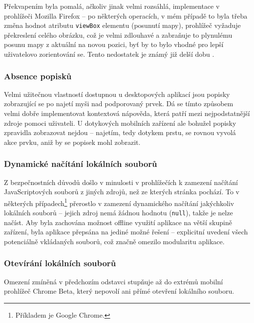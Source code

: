 Překvapením byla pomalá, ačkoliv jinak velmi rozsáhlá, implementace  v prohlížeči Mozilla Firefox -- po některých operacích, v mém případě to byla třeba změna hodnot atributu \texttt{viewBox}  elementu (posunutí mapy), prohlížeč vyžaduje překreslení celého obrázku, což je velmi zdlouhavé a zabraňuje to plynulému posunu mapy z aktuální na novou pozici, byť by to bylo vhodné pro lepší uživatelovo zorientování se. Tento nedostatek je známý již delší dobu \cite{Bugzilla}.

\subsubsection{Absence popisků}
Velmi užitečnou vlastností dostupnou u desktopových aplikací jsou popisky zobrazující se po najetí myši nad podporovaný prvek. Dá se tímto způsobem velmi dobře implementovat kontextová nápověda, která patří mezi nejpodstatnější zdroje pomoci uživateli. U dotykových mobilních zařízení ale bohužel popisky zpravidla zobrazovat nejdou -- najetím, tedy dotykem prstu, se rovnou vyvolá akce prvku, aniž by se popisek mohl zobrazit.

\subsubsection{Dynamické načítání lokálních souborů}
Z bezpečnostních důvodů došlo v minulosti v prohlížečích k zamezení načítání JavaScriptových souborů z jiných zdrojů, než ze kterých stránka pochází. To v některých případech\footnote{Příkladem je Google Chrome.} přerostlo v zamezení dynamického načítání jakýchkoliv lokálních souborů -- jejich zdroj nemá žádnou hodnotu (\texttt{null}), takže je nelze načíst. Aby byla zachována možnost offline využití aplikace na větší skupině zařízení, byla aplikace přepsána na jediné možné řešení -- explicitní uvedení všech potenciálně vkládaných souborů, což značně omezilo modularitu aplikace.

\subsubsection{Otevírání lokálních souborů}
Omezení zmíněná v předchozím odstavci stupňuje až do extrémů mobilní prohlížeč Chrome Beta, který nepovolí ani přímé otevření lokálního souboru. 